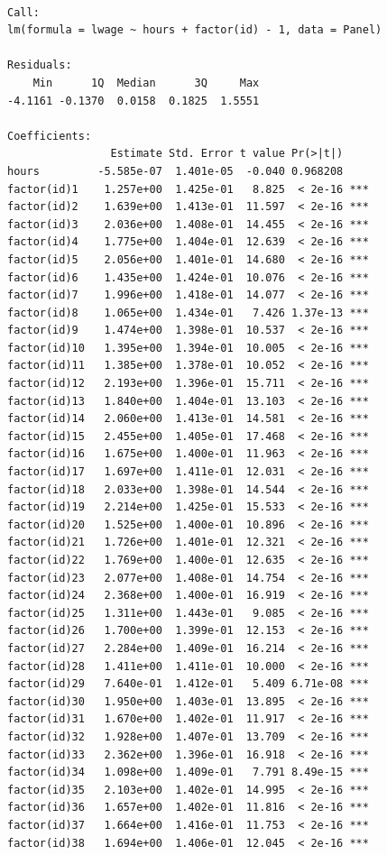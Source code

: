 \documentclass[]{book}
\begin{document}
\begin{verbatim}

Call:
lm(formula = lwage ~ hours + factor(id) - 1, data = Panel)

Residuals:
    Min      1Q  Median      3Q     Max 
-4.1161 -0.1370  0.0158  0.1825  1.5551 

Coefficients:
                Estimate Std. Error t value Pr(>|t|)    
hours         -5.585e-07  1.401e-05  -0.040 0.968208    
factor(id)1    1.257e+00  1.425e-01   8.825  < 2e-16 ***
factor(id)2    1.639e+00  1.413e-01  11.597  < 2e-16 ***
factor(id)3    2.036e+00  1.408e-01  14.455  < 2e-16 ***
factor(id)4    1.775e+00  1.404e-01  12.639  < 2e-16 ***
factor(id)5    2.056e+00  1.401e-01  14.680  < 2e-16 ***
factor(id)6    1.435e+00  1.424e-01  10.076  < 2e-16 ***
factor(id)7    1.996e+00  1.418e-01  14.077  < 2e-16 ***
factor(id)8    1.065e+00  1.434e-01   7.426 1.37e-13 ***
factor(id)9    1.474e+00  1.398e-01  10.537  < 2e-16 ***
factor(id)10   1.395e+00  1.394e-01  10.005  < 2e-16 ***
factor(id)11   1.385e+00  1.378e-01  10.052  < 2e-16 ***
factor(id)12   2.193e+00  1.396e-01  15.711  < 2e-16 ***
factor(id)13   1.840e+00  1.404e-01  13.103  < 2e-16 ***
factor(id)14   2.060e+00  1.413e-01  14.581  < 2e-16 ***
factor(id)15   2.455e+00  1.405e-01  17.468  < 2e-16 ***
factor(id)16   1.675e+00  1.400e-01  11.963  < 2e-16 ***
factor(id)17   1.697e+00  1.411e-01  12.031  < 2e-16 ***
factor(id)18   2.033e+00  1.398e-01  14.544  < 2e-16 ***
factor(id)19   2.214e+00  1.425e-01  15.533  < 2e-16 ***
factor(id)20   1.525e+00  1.400e-01  10.896  < 2e-16 ***
factor(id)21   1.726e+00  1.401e-01  12.321  < 2e-16 ***
factor(id)22   1.769e+00  1.400e-01  12.635  < 2e-16 ***
factor(id)23   2.077e+00  1.408e-01  14.754  < 2e-16 ***
factor(id)24   2.368e+00  1.400e-01  16.919  < 2e-16 ***
factor(id)25   1.311e+00  1.443e-01   9.085  < 2e-16 ***
factor(id)26   1.700e+00  1.399e-01  12.153  < 2e-16 ***
factor(id)27   2.284e+00  1.409e-01  16.214  < 2e-16 ***
factor(id)28   1.411e+00  1.411e-01  10.000  < 2e-16 ***
factor(id)29   7.640e-01  1.412e-01   5.409 6.71e-08 ***
factor(id)30   1.950e+00  1.403e-01  13.895  < 2e-16 ***
factor(id)31   1.670e+00  1.402e-01  11.917  < 2e-16 ***
factor(id)32   1.928e+00  1.407e-01  13.709  < 2e-16 ***
factor(id)33   2.362e+00  1.396e-01  16.918  < 2e-16 ***
factor(id)34   1.098e+00  1.409e-01   7.791 8.49e-15 ***
factor(id)35   2.103e+00  1.402e-01  14.995  < 2e-16 ***
factor(id)36   1.657e+00  1.402e-01  11.816  < 2e-16 ***
factor(id)37   1.664e+00  1.416e-01  11.753  < 2e-16 ***
factor(id)38   1.694e+00  1.406e-01  12.045  < 2e-16 ***

\end{verbatim}
\end{document}

